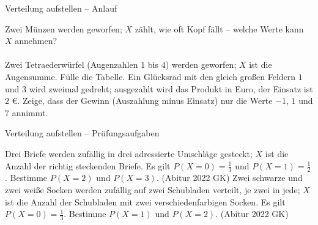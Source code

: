 \setcounter{aufgabe}{24}

\begin{aufgabe}{Verteilung aufstellen – Anlauf}
\begin{teile}
\teil Zwei Münzen werden geworfen; $X$ zählt, wie oft Kopf fällt – welche Werte kann $X$ annehmen? \\ \\ 
\teil Zwei Tetraederwürfel (Augenzahlen $1$ bis $4$) werden geworfen; $X$ ist die Augensumme. Fülle die Tabelle. 
\teil Ein Glücksrad mit den gleich großen Feldern $1$ und $3$ wird zweimal gedreht; ausgezahlt wird das Produkt in Euro, der Einsatz ist $2$ €. Zeige, dass der Gewinn (Auszahlung minus Einsatz) nur die Werte $-1$, $1$ und $7$ annimmt.
\end{teile}
\end{aufgabe}

\begin{aufgabe}{Verteilung aufstellen – Prüfungsaufgaben}
\begin{teile}
\teil Drei Briefe werden zufällig in drei adressierte Umschläge gesteckt; $X$ ist die Anzahl der richtig steckenden Briefe. Es gilt $P(X = 0) = \frac{1}{3}$ und $P(X = 1) = \frac{1}{2}$. Bestimme $P(X = 2)$ und $P(X = 3)$. \hfill (Abitur 2022 GK)
\teil Zwei schwarze und zwei weiße Socken werden zufällig auf zwei Schubladen verteilt, je zwei in jede; $X$ ist die Anzahl der Schubladen mit zwei verschiedenfarbigen Socken. Es gilt $P(X = 0) = \frac{1}{3}$. Bestimme $P(X = 1)$ und $P(X = 2)$. \hfill (Abitur 2022 GK)
\end{teile}
\end{aufgabe}

